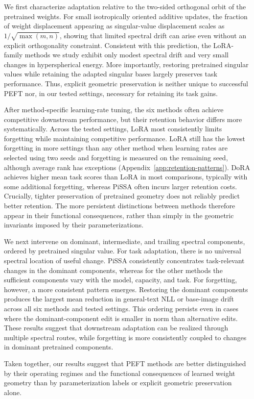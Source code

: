 We first characterize adaptation relative to the two-sided orthogonal orbit of
the pretrained weights.
For small isotropically oriented additive updates, the fraction of weight
displacement appearing as singular-value displacement scales as
$1/\sqrt{\max(m,n)}$, showing that limited spectral drift can arise even
without an explicit orthogonality constraint.
Consistent with this prediction, the LoRA-family methods we study exhibit only
modest spectral drift and very small changes in hyperspherical energy.
More importantly, restoring pretrained singular values while retaining the
adapted singular bases largely preserves task performance.
Thus, explicit geometric preservation is neither unique to successful PEFT nor,
in our tested settings, necessary for retaining its task gains.

After method-specific learning-rate tuning, the six methods often achieve
competitive downstream performance, but their retention behavior differs more
systematically.
Across the tested settings, LoRA most consistently limits forgetting while
maintaining competitive performance.
LoRA still has the lowest forgetting in more settings than any other method when learning rates are selected using two seeds and forgetting is measured on the remaining seed, although average rank has exceptions (Appendix~\ref{app:retention-patterns}).
DoRA achieves higher mean task scores than LoRA in most comparisons, typically
with some additional forgetting, whereas PiSSA often incurs larger retention
costs.
Crucially, tighter preservation of pretrained geometry does not reliably
predict better retention.
The more persistent distinctions between methods therefore appear in their
functional consequences, rather than simply in the geometric invariants imposed
by their parameterizations.

We next intervene on dominant, intermediate, and trailing spectral components,
ordered by pretrained singular value.
For task adaptation, there is no universal spectral location of useful change.
PiSSA consistently concentrates task-relevant changes in the dominant
components, whereas for the other methods the sufficient components vary with
the model, capacity, and task.
For forgetting, however, a more consistent pattern emerges.
Restoring the dominant components produces the largest mean reduction in
general-text NLL or base-image drift across all six methods and tested settings.
This ordering persists even in cases where the dominant-component edit is
smaller in norm than alternative edits.
These results suggest that downstream adaptation can be realized through
multiple spectral routes, while forgetting is more consistently coupled to
changes in dominant pretrained components.

Taken together, our results suggest that PEFT methods are better distinguished
by their operating regimes and the functional consequences of learned weight
geometry than by parameterization labels or explicit geometric preservation alone.
